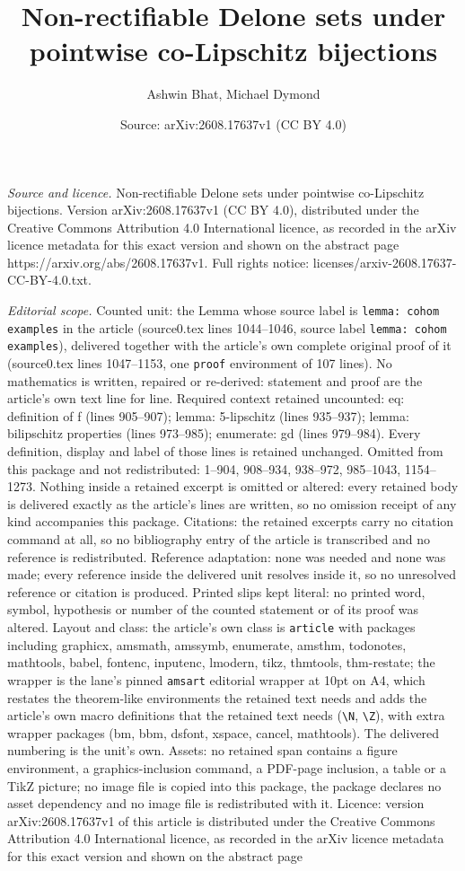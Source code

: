 \documentclass[10pt,a4paper]{amsart}
\title[Non-rectifiable Delone sets under pointwise co-Lipschitz bij]{Non-rectifiable Delone sets under pointwise co-Lipschitz bijections}
\author{Ashwin Bhat, Michael Dymond}
\date{Source: arXiv:2608.17637v1 (CC BY 4.0)}
\begin{document}
\maketitle

\noindent\emph{Source and licence.} Non-rectifiable Delone sets under pointwise co-Lipschitz bijections. Version arXiv:2608.17637v1 (CC BY 4.0), distributed under the Creative Commons Attribution 4.0 International licence, as recorded in the arXiv licence metadata for this exact version and shown on the abstract page https://arxiv.org/abs/2608.17637v1. Full rights notice: licenses/arxiv-2608.17637-CC-BY-4.0.txt.\par\smallskip

\noindent\textit{Editorial scope.} Counted unit: the Lemma whose source label is \texttt{lemma: cohom examples} in the article (source0.tex lines 1044--1046, source label \texttt{lemma: cohom examples}), delivered together with the article's own complete original proof of it (source0.tex lines 1047--1153, one \texttt{proof} environment of 107 lines). No mathematics is written, repaired or re-derived: statement and proof are the article's own text line for line. Required context retained uncounted: eq: definition of f (lines 905--907); lemma: 5-lipschitz (lines 935--937); lemma: bilipschitz properties (lines 973--985); enumerate: gd (lines 979--984). Every definition, display and label of those lines is retained unchanged. Omitted from this package and not redistributed: 1--904, 908--934, 938--972, 985--1043, 1154--1273. Nothing inside a retained excerpt is omitted or altered: every retained body is delivered exactly as the article's lines are written, so no omission receipt of any kind accompanies this package. Citations: the retained excerpts carry no citation command at all, so no bibliography entry of the article is transcribed and no reference is redistributed. Reference adaptation: none was needed and none was made; every reference inside the delivered unit resolves inside it, so no unresolved reference or citation is produced. Printed slips kept literal: no printed word, symbol, hypothesis or number of the counted statement or of its proof was altered. Layout and class: the article's own class is \texttt{article} with packages including graphicx, amsmath, amssymb, enumerate, amsthm, todonotes, mathtools, babel, fontenc, inputenc, lmodern, tikz, thmtools, thm-restate; the wrapper is the lane's pinned \texttt{amsart} editorial wrapper at 10pt on A4, which restates the theorem-like environments the retained text needs and adds the article's own macro definitions that the retained text needs (\texttt{\textbackslash N}, \texttt{\textbackslash Z}), with extra wrapper packages (bm, bbm, dsfont, xspace, cancel, mathtools). The delivered numbering is the unit's own. Assets: no retained span contains a figure environment, a graphics-inclusion command, a PDF-page inclusion, a table or a TikZ picture; no image file is copied into this package, the package declares no asset dependency and no image file is redistributed with it. Licence: version arXiv:2608.17637v1 of this article is distributed under the Creative Commons Attribution 4.0 International licence, as recorded in the arXiv licence metadata for this exact version and shown on the abstract page 
\end{document}
